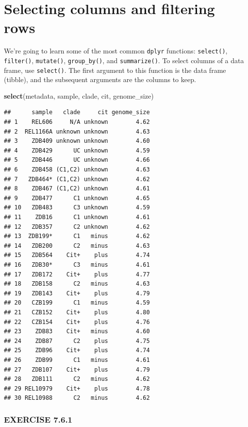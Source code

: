 \documentclass[
]{book}
\newenvironment{Shaded}{\begin{snugshade}}{\end{snugshade}}
\newcommand{\FunctionTok}[1]{\textcolor[rgb]{0.13,0.29,0.53}{\textbf{#1}}}
\newcommand{\NormalTok}[1]{#1}
\begin{document}
\section{Selecting columns and filtering rows}\label{selecting-columns-and-filtering-rows}

We're going to learn some of the most common \texttt{dplyr} functions: \texttt{select()}, \texttt{filter()}, \texttt{mutate()}, \texttt{group\_by()}, and \texttt{summarize()}. To select columns of a data frame, use \texttt{select()}. The first argument to this function is the data frame (tibble), and the subsequent arguments are the columns to keep.

\begin{Shaded}
\begin{Highlighting}[]
\FunctionTok{select}\NormalTok{(metadata, sample, clade, cit, genome\_size)}
\end{Highlighting}
\end{Shaded}

\begin{verbatim}
##      sample   clade     cit genome_size
## 1    REL606     N/A unknown        4.62
## 2  REL1166A unknown unknown        4.63
## 3    ZDB409 unknown unknown        4.60
## 4    ZDB429      UC unknown        4.59
## 5    ZDB446      UC unknown        4.66
## 6    ZDB458 (C1,C2) unknown        4.63
## 7   ZDB464* (C1,C2) unknown        4.62
## 8    ZDB467 (C1,C2) unknown        4.61
## 9    ZDB477      C1 unknown        4.65
## 10   ZDB483      C3 unknown        4.59
## 11    ZDB16      C1 unknown        4.61
## 12   ZDB357      C2 unknown        4.62
## 13  ZDB199*      C1   minus        4.62
## 14   ZDB200      C2   minus        4.63
## 15   ZDB564    Cit+    plus        4.74
## 16   ZDB30*      C3   minus        4.61
## 17   ZDB172    Cit+    plus        4.77
## 18   ZDB158      C2   minus        4.63
## 19   ZDB143    Cit+    plus        4.79
## 20   CZB199      C1   minus        4.59
## 21   CZB152    Cit+    plus        4.80
## 22   CZB154    Cit+    plus        4.76
## 23    ZDB83    Cit+   minus        4.60
## 24    ZDB87      C2    plus        4.75
## 25    ZDB96    Cit+    plus        4.74
## 26    ZDB99      C1   minus        4.61
## 27   ZDB107    Cit+    plus        4.79
## 28   ZDB111      C2   minus        4.62
## 29 REL10979    Cit+    plus        4.78
## 30 REL10988      C2   minus        4.62
\end{verbatim}

\subsubsection*{EXERCISE 7.6.1}\label{exercise-7.6.1}
\end{document}
